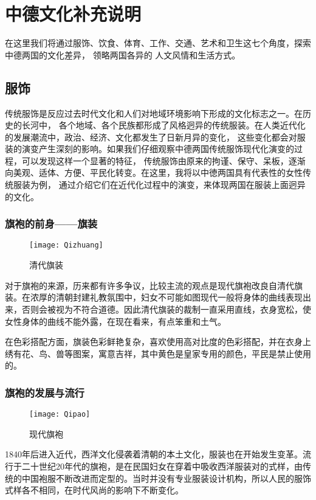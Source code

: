 \cleardoublepage
\backmatter
\chapter{中德文化补充说明}
    在这里我们将通过服饰、饮食、体育、工作、交通、艺术和卫生这七个角度，探索中德两国的文化差异，
领略两国各异的
人文风情和生活方式。

\section{服饰}
    传统服饰是反应过去时代文化和人们对地域环境影响下形成的文化标志之一。在历史的长河中，
各个地域、各个民族都形成了风格迥异的传统服装。在人类近代化的发展潮流中，政治、经济、文化都发生了日新月异的变化，
这些变化都会对服装的演变产生深刻的影响。如果我们仔细观察中德两国传统服饰现代化演变的过程，可以发现这样一个显著的特征，
传统服饰由原来的拘谨、保守、呆板，逐渐向美观、适体、方便、平民化转变。在这里，我将以中徳两国具有代表性的女性传统服装为例，
通过介绍它们在近代化过程中的演变，来体现两国在服装上面迥异的文化。

\subsection{旗袍的前身——旗装}
\begin{figure}[htb]
\centering
\texttt{[image: Qizhuang]}
\caption{清代旗装}
\end{figure}

    对于旗袍的来源，历来都有许多争议，比较主流的观点是现代旗袍改良自清代旗装。在浓厚的清朝封建礼教氛围中，妇女不可能如图现代一般将身体的曲线表现出来，否则会被视为不符合道德。因此清代旗装的裁制一直采用直线，衣身宽松，使女性身体的曲线不能外露，在现在看来，有点笨重和土气。 

    在色彩搭配方面，旗装色彩鲜艳复杂，喜欢使用高对比度的色彩搭配，并在衣身上绣有花、鸟、兽等图案，寓意吉祥，其中黄色是皇家专用的颜色，平民是禁止使用的。 
    
\subsection{旗袍的发展与流行}
\begin{figure}[htb]
\centering
\texttt{[image: Qipao]}
\caption{现代旗袍}
\end{figure}

    1840年后进入近代，西洋文化侵袭着清朝的本土文化，服装也在开始发生变革。流行于二十世纪20年代的旗袍，是在民国妇女在穿着中吸收西洋服装对的式样，由传统的中国袍服不断改进而定型的。当时并没有专业服装设计机构，所以人民的服饰式样各不相同，在时代风尚的影响下不断变化。 

